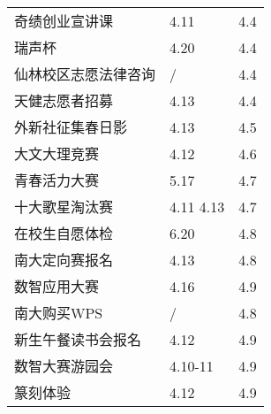 \documentclass[letterpaper, 12pt]{article}
\begin{document}
\begin{multicols}{2}
{\begin{longtable}{|>{\centering\arraybackslash}m{}|m{}|m{}|}
    奇绩创业宣讲课 & 4.11 & 4.4\\
    瑞声杯 & 4.20 & 4.4\\
    仙林校区志愿法律咨询 & / & 4.4\\
    天健志愿者招募 & 4.13 & 4.4\\
    外新社征集春日影 & 4.13 & 4.5\\
    大文大理竞赛 & 4.12 & 4.6\\
    青春活力大赛 & 5.17 & 4.7\\
    十大歌星淘汰赛 & 4.11 4.13 & 4.7\\
    在校生自愿体检 & 6.20 & 4.8\\
    南大定向赛报名 & 4.13 & 4.8\\
    数智应用大赛 & 4.16 & 4.9\\
    南大购买WPS & / & 4.8\\
    新生午餐读书会报名 & 4.12 & 4.9\\
    数智大赛游园会 & 4.10-11 & 4.9\\
    篆刻体验 & 4.12 & 4.9\\
    \hline
\end{longtable}
\unskip
\unpenalty
\unpenalty}\unvbox\colbbox
\end{multicols}
\end{document}
